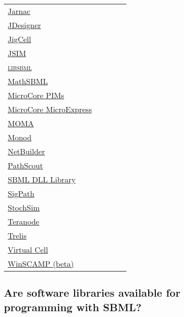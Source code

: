 \documentclass{sbmlfaq}
\newcommand{\yes}{\raisebox{1pt}{\rule{3.5pt}{3.5pt}}}
\newcommand{\yes}{\htmladdimg{sbml-faq-green-dot.gif}}
\begin{document}
\begin{table}[htb]
\begin{tabular}{l!{\hspace{10pt}}c!{\hspace{10pt}}c!{\hspace{10pt}}c!{\hspace{10pt}}c}
    \href{http://www.sys-bio.org/}{Jarnac} & \yes & \yes \\
    \href{http://www.sys-bio.org/}{JDesigner} & \yes & \yes \\
    \href{http://gnida.cs.vt.edu/~cellcyclepse/}{JigCell} & & & \yes & \yes\\
    \href{http://nsr.bioeng.washington.edu/Software/JSIM/}{JSIM} & \yes\\
    \href{http://www.sf.net/projects/sbml}{\textsc{libsbml}} & \yes & \yes & \yes & \yes\\
    \href{http://www.sf.net/projects/sbml}{MathSBML} & \yes & \yes\\
    \href{http://www.ucl.ac.uk/oncology/MicroCore/microcore.htm}{MicroCore PIMs} & \yes & \yes & \yes & \yes\\
    \href{http://www.ucl.ac.uk/oncology/MicroCore/microcore.htm}{MicroCore MicroExpress} & \yes & \yes & \yes & \yes\\
    \href{http://arep.med.harvard.edu/moma/}{MOMA} & & & & \yes\\ 
    \href{http://monod.molsci.org/}{Monod} & & & & \yes\\ 
    \href{http://strc.herts.ac.uk/bio/maria/NetBuilder/}{NetBuilder} & & \yes\\
    \href{http://simpath.lionbioscience.com:8080/documentation/pathscout11}{PathScout} & & \yes\\
    \href{http://www.cds.caltech.edu/~hsauro/sbml.htm}{SBML DLL Library} & \yes & \yes\\
    \href{http://www.sigpath.org}{SigPath} & & \yes\\
    \href{http://www.zoo.cam.ac.uk/comp-cell/StochSim.html}{StochSim} & & \yes\\
    \href{http://www.teranode.com}{Teranode} & & & & \\
    \href{http://www.sourceforge.net/projects/trelis}{Trelis} & \yes & \yes & & \\
    \href{http://www.nrcam.uchc.edu/vcell_development/vcell_dev.html}{Virtual Cell} & \yes & \yes\\
    \href{http://www.sys-bio.org/}{WinSCAMP (beta)} & \yes & \yes\\
    \bottomrule
  \end{tabular}
\end{table}


\subsection{Are software libraries available for programming with SBML?}
\label{sec:libraries}
\end{document}
